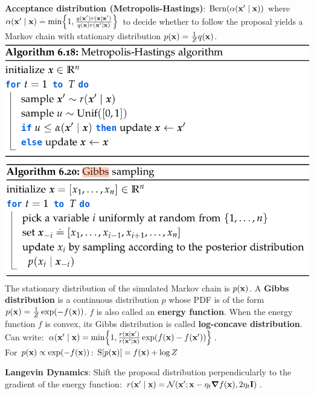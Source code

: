 \textbf{Acceptance distribution (Metropolis-Hastings)}: $\Bern{\alpha(\vxp \mid \vx)}$ where $\alpha(\vxp \mid \vx) \defeq \min \braces*{1, \frac{q(\vxp) r(\vx \mid \vxp)}{q(\vx) r(\vxp \mid \vx)}}$ to decide whether to follow the proposal yields a Markov chain with stationary distribution $p(\mathbf{x}) = \frac{1}{Z} q(\mathbf{x})$.
\includegraphics[width=0.98\linewidth, trim={0 0 5cm 0}]{images/Metropiolis_Hasting.png}
\includegraphics[width=0.98\linewidth]{images/Gibbs_Sampling.png} 
The stationary distribution of the simulated Markov chain is $p(\mathbf{x})$.
A \textbf{Gibbs distribution} is a continuous distribution $p$ whose PDF is of the form $p(\mathbf{x}) = \frac{1}{Z} \exp(- f(\mathbf{x}))$. $f$ is also called an \textbf{energy function}.
When the energy function $f$ is convex, its Gibbs distribution is called \textbf{log-concave distribution}. Can write: $\alpha(\vxp \mid \vx) = \min \braces*{1, \frac{r(\vx \mid \vxp)}{r(\vxp \mid \vx)} \exp(f(\vx) - f(\vxp))}$. \\
For $p(\mathbf{x}) \propto \exp(-f(\mathbf{x}))$: $\S{p(\vx)} = f(\vx) + \log Z$
\begin{framed}
    \textbf{Langevin Dynamics}: Shift the proposal distribution perpendicularly to the gradient of the energy function: $r(\vxp \mid \vx) = \N[\vxp]{\vx - \eta_t \grad f(\vx)}{2 \eta_t \mI}$.
\end{framed}
